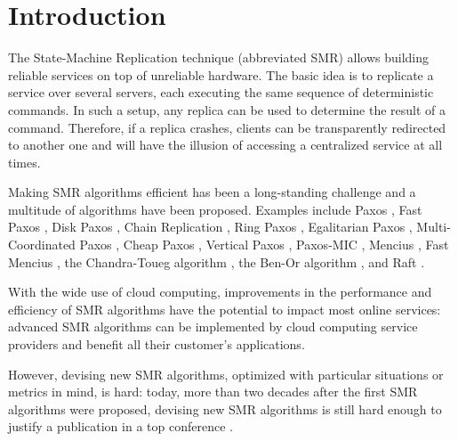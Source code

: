 \section{Introduction}

The State-Machine Replication technique (abbreviated SMR) allows
building reliable services on top of unreliable hardware. The basic idea is to 
replicate a service over several servers, each executing the same
sequence of deterministic commands. In such a setup, any replica can be used to determine the result of a command. Therefore, if a replica crashes, clients can be transparently redirected to another one and will have the illusion of accessing a centralized service at all times.

Making SMR algorithms efficient has been a long-standing
challenge and a multitude of algorithms have been proposed. Examples
include Paxos \cite{lamport2001paxos}, Fast Paxos \cite{Lamport06FastPaxos}, Disk Paxos
\cite{GafniLamport03DiskPaxos}, Chain Replication
\cite{RenesseSchneider04ChainReplicationSupportingHighThroughputAvailability},
Ring Paxos
\cite{MarandiETAL10RingPaxosHighthroughputAtomicBroadcastProtocol},
Egalitarian Paxos
\cite{MoraruAndersenKaminsky13ThereIsMoreConsensusEgalitarianParliaments},
Multi-Coordinated Paxos
\cite{CamargosSchmidtPedone07MulticoordinatedPaxos}, Cheap Paxos
\cite{LamportMassa04CheapPaxos}, Vertical Paxos
\cite{LamportMalkhiZhou09VerticalPaxosPrimarybackupReplication},
Paxos-MIC
\cite{HurfinMoiseNarzul11AdaptiveFastPaxosMakingQuickEverlasting},
Mencius
\cite{MaoJunqueiraMarzullo08MenciusBuildingEfficientReplicatedStateMachine},
Fast Mencius \cite{WeiETAL13FastMenciusMenciusLowCommitLatency}, the Chandra-Toueg algorithm \cite{ChandraToueg96UnreliableFailureDetectorsReliableDistributedSystems}, the Ben-Or algorithm \cite{BenOr83AnotherAdvantageFreeChoiceCompletelyAsynchronous}, and Raft \cite{OngaroOusterhout14SearchUnderstandableConsensusAlgorithm}.

With the wide use of cloud computing, improvements in the performance and efficiency of SMR algorithms have the potential to impact most online services: advanced SMR algorithms can be implemented by cloud computing service providers and benefit all their customer's applications.

However, devising new SMR algorithms, optimized with particular situations or metrics in mind, is hard: today, more than two decades after the first SMR algorithms \cite{Lamport98ParttimeParliament,BirmanJoseph87ReliableCommunicationPresenceFailures,OkiLiskov88ViewstampedReplicationGeneralPrimaryCopy,DworkLynchStockmeyer84ConsensusPresencePartialSynchronyPreliminaryVersion} were proposed, devising new SMR algorithms is still hard enough to justify a publication in a top conference \cite{MoraruAndersenKaminsky13ThereIsMoreConsensusEgalitarianParliaments,OngaroOusterhout14SearchUnderstandableConsensusAlgorithm}.

